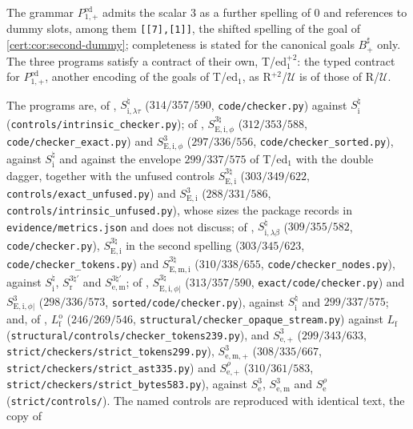 The grammar $P^{\mathrm{ed}}_{1,+}$ admits the scalar $3$ as a further spelling of $0$ and
references to dummy slots, among them \texttt{[[7],[1]]}, the shifted spelling of the goal of
\cref{cert:cor:second-dummy}; completeness is stated for the canonical goals $B^{\sharp}_{+}$ only.
The three programs satisfy a contract of their own, T/ed$_1^{+2}$: the typed contract for
$P^{\mathrm{ed}}_{1,+}$, another encoding of the goals of T/ed$_1$, as R$^{+2}$/$\mathcal U$ is of
those of R/$\mathcal U$.

The programs are, of , $S^{\natural}_{\mathrm{i},\lambda\tau}$
($314/357/590$, \texttt{code/checker.py}) against $S^{\natural}_{\mathrm i}$
(\texttt{controls/intrinsic\_checker.py}); of ,
$S^{3\natural}_{\mathrm{E,i},\phi}$ ($312/353/588$, \texttt{code/checker\_exact.py}) and
$S^{3}_{\mathrm{E,i},\phi}$ ($297/336/556$, \texttt{code/checker\_sorted.py}), against
$S^{\natural}_{\mathrm i}$ and against the envelope $299/337/575$ of T/ed$_1$ with the double
dagger, together with the unfused controls $S^{3\natural}_{\mathrm{E,i}}$ ($303/349/622$,
\texttt{controls/exact\_unfused.py}) and $S^{3}_{\mathrm{E,i}}$ ($288/331/586$,
\texttt{controls/intrinsic\_unfused.py}), whose sizes the package records in
\texttt{evidence/metrics.json} and does not discuss; of ,
$S^{\natural}_{\mathrm{i},\lambda\beta}$ ($309/355/582$, \texttt{code/checker.py}),
$S^{3\natural}_{\mathrm{E,i}}$ in the second spelling ($303/345/623$,
\texttt{code/checker\_tokens.py}) and $S^{3\natural}_{\mathrm{E,m,i}}$ ($310/338/655$,
\texttt{code/checker\_nodes.py}), against $S^{\natural}_{\mathrm i}$, $S^{3\natural\prime}_{\mathrm r}$
and $S^{3\natural\prime}_{\mathrm{e,m}}$; of ,
$S^{3\natural}_{\mathrm{E,i},\phi|}$ ($313/357/590$, \texttt{exact/code/checker.py}) and
$S^{3}_{\mathrm{E,i},\phi|}$ ($298/336/573$, \texttt{sorted/code/checker.py}), against
$S^{\natural}_{\mathrm i}$ and $299/337/575$; and, of ,
$L^{\mathrm o}_{\mathrm f}$ ($246/269/546$, \texttt{structural/checker\_opaque\_stream.py}) against
$L_{\mathrm f}$ (\texttt{structural/controls/checker\_tokens239.py}), and
$S^{3}_{\mathrm e,+}$ ($299/343/633$, \texttt{strict/checkers/strict\_tokens299.py}),
$S^{3}_{\mathrm{e,m},+}$ ($308/335/667$, \texttt{strict/checkers/strict\_ast335.py}) and
$S^{\rho}_{\mathrm e,+}$ ($310/361/583$, \texttt{strict/checkers/strict\_bytes583.py}), against
$S^{3}_{\mathrm e}$, $S^{3}_{\mathrm{e,m}}$ and $S^{\rho}_{\mathrm e}$
(\texttt{strict/controls/}). The named controls are reproduced with identical text, the copy of
